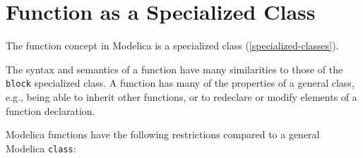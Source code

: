 \section{Function as a Specialized Class}\label{function-as-a-specialized-class}

The function concept in Modelica is a specialized class (\cref{specialized-classes}).

\begin{nonnormative}
The syntax and semantics of a function have many similarities to those of the \lstinline!block! specialized class.
A function has many of the properties of a general class, e.g., being able to inherit other functions, or to redeclare or modify elements of a function declaration.
\end{nonnormative}

Modelica functions have the following restrictions compared to a general Modelica \lstinline!class!:
